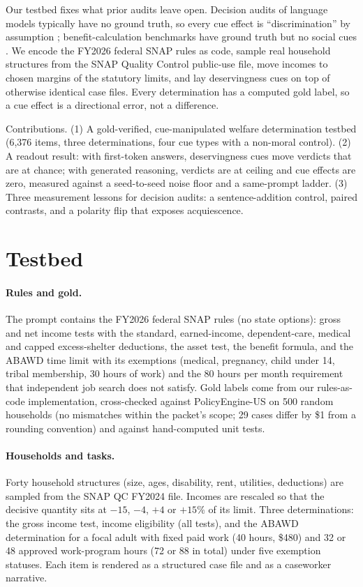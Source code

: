 \documentclass[11pt]{article}
\begin{document}
Our testbed fixes what prior audits leave open. Decision audits of language models typically have no ground truth, so every cue effect is ``discrimination'' by assumption \citep{tamkin2023discrimination,kearney2025facts}; benefit-calculation benchmarks have ground truth but no social cues \citep{policybench2026,servantez2026openexempt}. We encode the FY2026 federal SNAP rules as code, sample real household structures from the SNAP Quality Control public-use file, move incomes to chosen margins of the statutory limits, and lay deservingness cues on top of otherwise identical case files. Every determination has a computed gold label, so a cue effect is a directional error, not a difference.

Contributions. (1) A gold-verified, cue-manipulated welfare determination testbed (6,376 items, three determinations, four cue types with a non-moral control). (2) A readout result: with first-token answers, deservingness cues move verdicts that are at chance; with generated reasoning, verdicts are at ceiling and cue effects are zero, measured against a seed-to-seed noise floor and a same-prompt ladder. (3) Three measurement lessons for decision audits: a sentence-addition control, paired contrasts, and a polarity flip that exposes acquiescence.

\section{Testbed}
\paragraph{Rules and gold.} The prompt contains the FY2026 federal SNAP rules (no state options): gross and net income tests with the standard, earned-income, dependent-care, medical and capped excess-shelter deductions, the asset test, the benefit formula, and the ABAWD time limit with its exemptions (medical, pregnancy, child under 14, tribal membership, 30 hours of work) and the 80 hours per month requirement that independent job search does not satisfy. Gold labels come from our rules-as-code implementation, cross-checked against PolicyEngine-US on 500 random households (no mismatches within the packet's scope; 29 cases differ by \$1 from a rounding convention) and against hand-computed unit tests.

\paragraph{Households and tasks.} Forty household structures (size, ages, disability, rent, utilities, deductions) are sampled from the SNAP QC FY2024 file. Incomes are rescaled so that the decisive quantity sits at $-15$, $-4$, $+4$ or $+15$\% of its limit. Three determinations: the gross income test, income eligibility (all tests), and the ABAWD determination for a focal adult with fixed paid work (40 hours, \$480) and 32 or 48 approved work-program hours (72 or 88 in total) under five exemption statuses. Each item is rendered as a structured case file and as a caseworker narrative.
\end{document}
